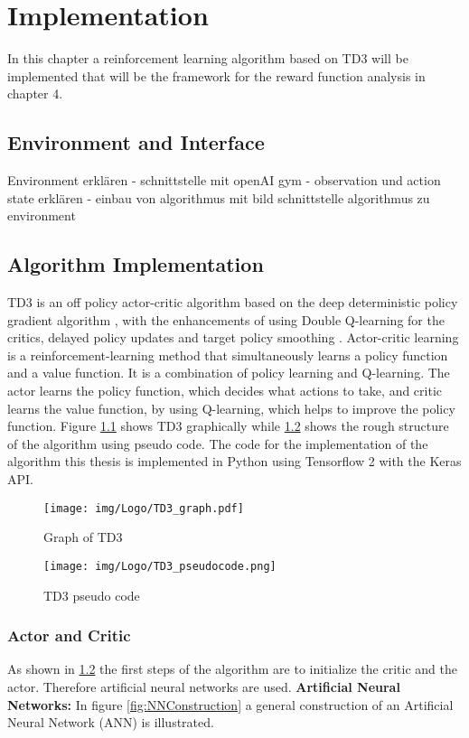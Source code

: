 \chapter{Implementation}

In this chapter a reinforcement learning algorithm based on TD3 will be implemented that will be the framework for the reward function analysis in chapter 4.

\section{Environment and Interface}
Environment erklären - schnittstelle mit openAI gym - observation und action state erklären - einbau von algorithmus mit bild schnittstelle algorithmus zu environment 

\section{Algorithm Implementation}
TD3 is an off policy actor-critic algorithm based on the deep deterministic policy gradient algorithm \cite{lillicrap2015continuous}, with the enhancements of using Double Q-learning for the critics, delayed policy updates and target policy smoothing \cite{fujimoto2018}.
Actor-critic learning is a reinforcement-learning method that simultaneously learns a policy function and a value function. It is a combination of policy learning and Q-learning. The actor learns the policy function, which decides what actions to take, and critic learns the value function, by using Q-learning, which helps to improve the policy function.
Figure \ref{fig:TD3_graph} shows TD3 graphically while \ref{fig:TD3_pseudo} shows the rough structure of the algorithm using pseudo code. The code for the implementation of the algorithm this thesis is implemented in Python using Tensorflow 2 with the Keras API.

\begin{figure} 
	\centering
	\texttt{[image: img/Logo/TD3\_graph.pdf]}
	\caption{Graph of TD3}
	\label{fig:TD3_graph}
\end{figure}

\begin{figure} 
	\centering
	\texttt{[image: img/Logo/TD3\_pseudocode.png]}
	\caption{TD3 pseudo code}
	\label{fig:TD3_pseudo}
\end{figure}

\subsection{Actor and Critic}
As shown in \ref{fig:TD3_pseudo} the first steps of the algorithm are to initialize the critic and the actor. Therefore artificial neural networks are used.
\newline \newline
\textbf{Artificial Neural Networks:}
In figure \ref{fig:NNConstruction} a general construction of an Artificial Neural Network (ANN) is illustrated.


